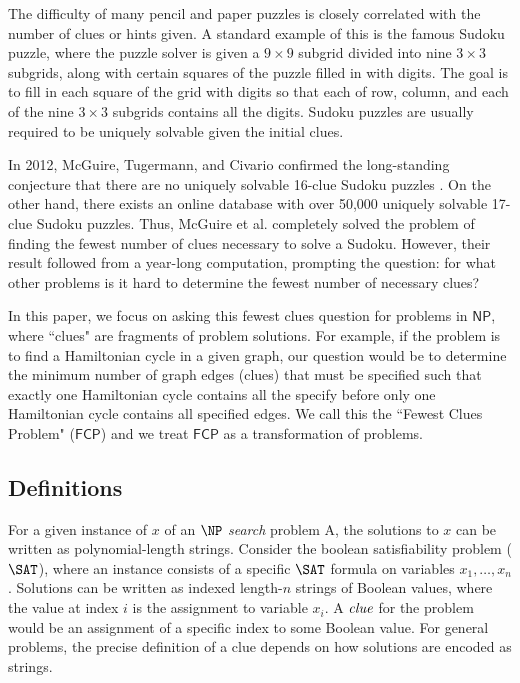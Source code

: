 \documentclass[runningheads,a4paper]{llncs}
\begin{document}
The difficulty of many pencil and paper puzzles is closely correlated with the number of clues or hints given. A standard example of this is the famous Sudoku puzzle, where the puzzle solver is given a $9 \times 9$ subgrid divided into nine $3 \times 3$ subgrids, along with certain squares of the puzzle filled in with digits. The goal is to fill in each square of the grid with digits so that each of row, column, and each of the nine $3 \times 3$ subgrids contains all the digits. Sudoku puzzles are usually required to be uniquely solvable given the initial clues.

In 2012, McGuire, Tugermann, and Civario confirmed the long-standing conjecture that there are no uniquely solvable 16-clue Sudoku puzzles \cite{mcguire2012there}. On the other hand, there exists an online database with over 50,000 uniquely solvable 17-clue Sudoku puzzles. Thus, McGuire et al. completely solved the problem of finding the fewest number of clues necessary to solve a Sudoku. However, their result followed from a year-long computation, prompting the question: for what other problems is it hard to determine the fewest number of necessary clues?

In this paper, we focus on asking this fewest clues question for problems in $\mathsf{NP}$, where ``clues" are fragments of problem solutions. For example, if the problem is to find a Hamiltonian cycle in a given graph, our question would be to determine the minimum number of graph edges (clues) that must be specified such that exactly one Hamiltonian cycle contains all the  specify before only one Hamiltonian cycle contains all specified edges. We call this the ``Fewest Clues Problem" ($\mathsf{FCP}$) and we treat $\mathsf{FCP}$ as a transformation of problems. 

\subsection{Definitions}

For a given instance of $x$ of an $\NP$ \emph{search} problem A, the solutions to $x$ can be written as polynomial-length strings. Consider the boolean satisfiability problem ($\SAT$), where an instance consists of a specific $\SAT$ formula on variables $x_1,\dots,x_n$. Solutions can be written as indexed length-$n$ strings of Boolean values, where the value at index $i$ is the assignment to variable $x_i$. A $\emph{clue}$ for the problem would be an assignment of a specific index to some Boolean value. For general problems, the precise definition of a clue depends on how solutions are encoded as strings.
\end{document}
